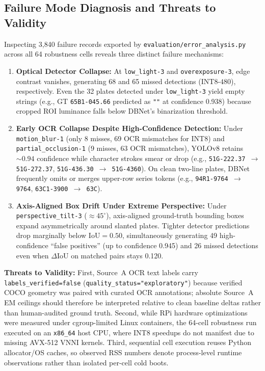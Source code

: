 \documentclass[pdflatex,sn-mathphys-num]{sn-jnl}
\begin{document}
\subsection{Failure Mode Diagnosis and Threats to Validity}\label{subsec:failures}
Inspecting 3,840 failure records exported by \texttt{evaluation/error\_analysis.py} across all 64 robustness cells reveals three distinct failure mechanisms:
\begin{enumerate}
    \item \textbf{Optical Detector Collapse:} At \texttt{low\_light-3} and \texttt{overexposure-3}, edge contrast vanishes, generating 68 and 65 missed detections (INT8-$480$), respectively. Even the 32 plates detected under \texttt{low\_light-3} yield empty strings (e.g., GT \texttt{65B1-045.66} predicted as \texttt{""} at confidence 0.938) because cropped ROI luminance falls below DBNet's binarization threshold.
    \item \textbf{Early OCR Collapse Despite High-Confidence Detection:} Under \texttt{motion\_blur-1} (only 8 misses, 69 OCR mismatches for INT8) and \texttt{partial\_occlusion-1} (9 misses, 63 OCR mismatches), YOLOv8 retains $\sim 0.94$ confidence while character strokes smear or drop (e.g., \texttt{51G-222.37 $\rightarrow$ 51G-272.37}, \texttt{51G-436.30 $\rightarrow$ 51G-4360}). On clean two-line plates, DBNet frequently omits or merges upper-row series tokens (e.g., \texttt{94R1-9764 $\rightarrow$ 9764}, \texttt{63C1-3900 $\rightarrow$ 63C}).
    \item \textbf{Axis-Aligned Box Drift Under Extreme Perspective:} Under \texttt{perspective\_tilt-3} ($\approx 45^\circ$), axis-aligned ground-truth bounding boxes expand asymmetrically around slanted plates. Tighter detector predictions drop marginally below $\text{IoU}=0.50$, simultaneously generating 49 high-confidence ``false positives'' (up to confidence 0.945) and 26 missed detections even when $\Delta\text{IoU}$ on matched pairs stays 0.120.
\end{enumerate}

\textbf{Threats to Validity:} First, Source~A OCR text labels carry \texttt{labels\_verified=false} (\texttt{quality\_status="exploratory"}) because verified COCO geometry was paired with curated OCR annotations; absolute Source~A EM ceilings should therefore be interpreted relative to clean baseline deltas rather than human-audited ground truth. Second, while RPi hardware optimizations were measured under cgroup-limited Linux containers, the 64-cell robustness run executed on an \texttt{x86\_64} host CPU, where INT8 speedups do not manifest due to missing AVX-512 VNNI kernels. Third, sequential cell execution reuses Python allocator/OS caches, so observed RSS numbers denote process-level runtime observations rather than isolated per-cell cold boots.
\end{document}
